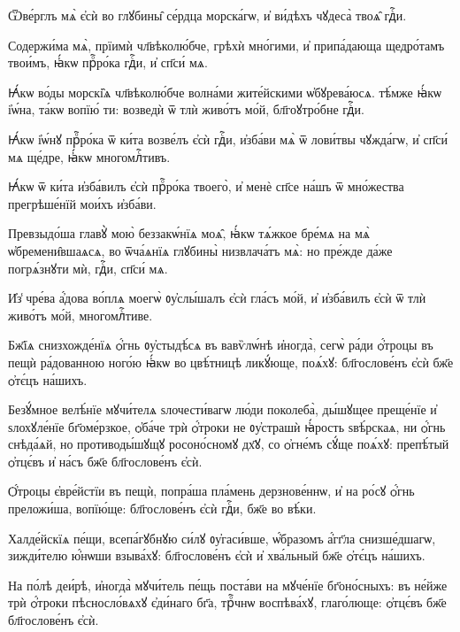\hKv Ѿве́рглъ мѧ̀ є҆сѝ во глꙋбины̑ се́рдца морска́гѡ, и҆  ви́дѣхъ чꙋдеса̀ твоѧ̑ гдⷭ҇и. 

\hKv Содержи́ма мѧ̀, прїимѝ чл҃вѣколю́бче, грѣхѝ мно́гими, и҆  припа́дающа щедро́тамъ твои́мъ, ꙗ҆́кѡ прⷪ҇ро́ка гдⷭ҇и, и҆  сп҃си́ мѧ. 
%

\hKv Ꙗ҆́кѡ во́ды морскі̑ѧ  чл҃вѣколю́бче волна́ми жите́йскими ѡ҆бꙋрева́юсѧ. тѣ́мже  ꙗ҆́кѡ і҆ѡ́на, та́кѡ вопїю́ ти: возведѝ ѿ тлѝ живо́тъ  мо́й, бл҃гоꙋтро́бне гдⷭ҇и. 

\hKv Ꙗ҆́кѡ і҆ѡ́нꙋ прⷪ҇ро́ка ѿ ки́та возве́лъ є҆сѝ гдⷭ҇и,  и҆зба́ви мѧ̀ ѿ лови́твы чꙋжда́гѡ, и҆ сп҃си́ мѧ ще́дре,  ꙗ҆́кѡ многомлⷭ҇тивъ. 

\hKv Ꙗ҆́кѡ ѿ ки́та и҆зба́вилъ є҆сѝ прⷪ҇ро́ка твоего̀, и҆  менѐ сп҃се на́шъ ѿ мно́жества прегрѣше́нїй мои́хъ  и҆зба́ви. 

\hKv Превзыдо́ша главꙋ̀ мою̀ беззакѡ́нїѧ моѧ̑,  ꙗ҆́кѡ тѧ́жкое бре́мѧ на мѧ̀ ѡ҆бремени̑вшаѧсѧ, во  ѿча́ѧнїѧ глꙋбины̀ низвлача́тъ мѧ̀: но пре́жде да́же  погрѧ́знꙋти мѝ, гдⷭ҇и, сп҃си́ мѧ.  

\hKv И҆з̾ чре́ва а҆́дова во́плѧ моегѡ̀ ᲂу҆слы́шалъ є҆сѝ  гла́съ мо́й, и҆ и҆зба́вилъ є҆сѝ ѿ тлѝ живо́тъ мо́й,  многомлⷭ҇тиве. 
%

\hKv Бж҃їѧ снизхожде́нїѧ ѻ҆́гнь ᲂу҆стыдѣ́сѧ въ вавѷлѡ́нѣ  и҆ногда̀, сегѡ̀ ра́ди ѻ҆́троцы въ пещѝ ра́дованною ного́ю  ꙗ҆́кѡ во цвѣ́тницѣ ликꙋ́юще, поѧ́хꙋ: бл҃гослове́нъ є҆сѝ  бж҃е ѻ҆тє́цъ на́шихъ.  
%

\hKv Безꙋ́мное велѣ́нїе мꙋчи́телѧ  ѕлочести́вагѡ лю́ди поколеба̀, ды́шꙋщее преще́нїе и҆  ѕлохꙋле́нїе бг҃оме́рзкое, ѻ҆ба́че трѝ ѻ҆́троки не  ᲂу҆страшѝ ꙗ҆́рость ѕвѣ́рскаѧ, ни ѻ҆́гнь снѣда́ѧй, но  противоды́шꙋщꙋ росоно́сномꙋ дх҃ꙋ, со ѻ҆гне́мъ сꙋ́ще поѧ́хꙋ:  препѣ́тый ѻ҆тцє́въ и҆ на́съ бж҃е бл҃гослове́нъ є҆сѝ.   
%

\hKv Ѻ҆́троцы є҆вре́йстїи въ пещѝ, попра́ша пла́мень  дерзнове́ннѡ, и҆ на ро́сꙋ ѻ҆́гнь преложи́ша, вопїю́ще:  бл҃гослове́нъ є҆сѝ гдⷭ҇и, бж҃е во вѣ́ки. 

\hKv Халде́йскїѧ пе́щи, всепа́гꙋбнꙋю си́лꙋ ᲂу҆гаси́вше,  ѡ҆́бразомъ а҆́гг҃ла снизше́дшагѡ, зижди́телю ю҆́нѡши  взыва́хꙋ: бл҃гослове́нъ є҆сѝ и҆ хва́льный бж҃е ѻ҆тє́цъ  на́шихъ. 

\hKv На по́лѣ деи́рѣ, и҆ногда̀ мꙋчи́тель пе́щь поста́ви на  мꙋче́нїе бг҃оно́сныхъ: въ не́йже трѝ ѻ҆́троки  пѣсносло́вѧхꙋ є҆ди́наго бг҃а, трⷪ҇чнѡ воспѣва́хꙋ,  глаго́люще: ѻ҆тцє́въ бж҃е бл҃гослове́нъ є҆сѝ. 

